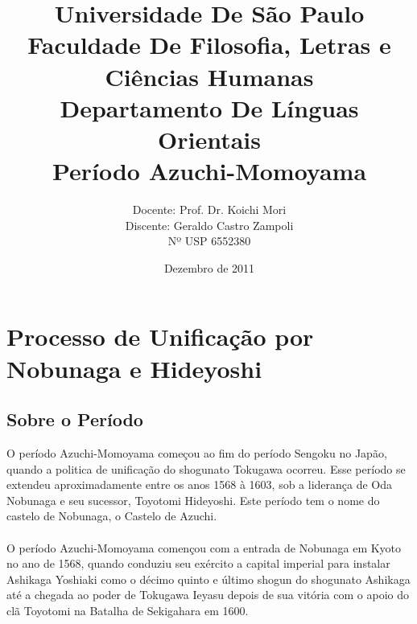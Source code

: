 \documentclass[12pt, a4paper]{article}
\title{Universidade De São Paulo\\
    Faculdade De Filosofia, Letras e Ciências Humanas\\
    Departamento De Línguas Orientais\\
    \vspace{3cm}
    \textbf{\Huge{Período Azuchi-Momoyama}}\\
    \vspace{4cm}}
\author{Docente: Prof. Dr. Koichi Mori\\
    Discente: Geraldo Castro Zampoli\\
    Nº USP 6552380}
\date{Dezembro de 2011}
\begin{document}
    \maketitle
    \newpage
    
    \section {Processo de Unificação por Nobunaga e Hideyoshi}
		\subsection {Sobre o Período}
			O período Azuchi-Momoyama começou ao fim do período Sengoku no Japão, quando a politica de unificação do shogunato Tokugawa ocorreu. Esse período se extendeu aproximadamente entre os anos 1568 à 1603, sob a liderança de Oda Nobunaga e seu sucessor, Toyotomi Hideyoshi. Este período tem o nome do castelo de Nobunaga, o Castelo de Azuchi.	\\
			\\
			\indent O período Azuchi-Momoyama començou com a entrada de Nobunaga em Kyoto no ano de 1568, quando conduziu seu exército a capital imperial para instalar Ashikaga Yoshiaki como o décimo quinto e último shogun do shogunato Ashikaga até a chegada ao poder de Tokugawa Ieyasu depois de sua vitória com o apoio do clã Toyotomi na Batalha de Sekigahara em 1600.\\
\end{document}
